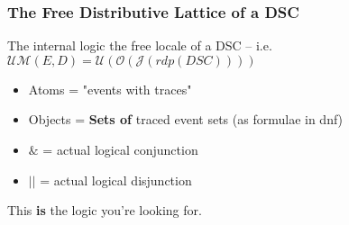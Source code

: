 \documentclass{beamer}
\newcommand{\UMc}{\mathcal{UM}}
\newcommand{\Oc}{\mathcal{O}}
\newcommand{\Ucc}{\mathcal{U}}
\newcommand{\Jc}{\mathcal{J}}
\begin{document}
\begin{frame}
\frametitle{The Free Distributive Lattice of a DSC}
The internal logic the free locale of a DSC -- i.e. \(\UMc(E,D)  = \Ucc(\Oc(\Jc(rdp(DSC))))\)

\begin{itemize}
\item Atoms = "events with traces"
\item Objects = \textbf{Sets of} traced event sets (as formulae in dnf)
\item \(\&\) = actual logical conjunction
\item \(||\) = actual logical disjunction
\end{itemize}

This \textbf{is} the logic you're looking for.

\end{frame}
\end{document}
